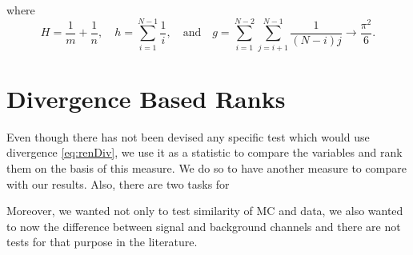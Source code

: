 where
\begin{equation}
H = \frac{1}{m}+\frac{1}{n},\quad	h = \sum_{i=1}^{N-1}\frac{1}{i},\quad \mathrm{ and } \quad g = \sum_{i=1}^{N-2}\sum_{j=i+1}^{N-1}\frac{1}{(N-i)j}\rightarrow \frac{\pi^2}{6}.
\end{equation}

\section{\ren Divergence Based Ranks}
Even though there has not been devised any specific test which would use \ren divergence \eqref{eq:renDiv}, we use it as a statistic to compare the variables and rank them on the basis of this measure. We do so to have another measure to compare with our results. Also, there are two tasks for 

Moreover, we wanted not only to test similarity of MC and data, we also wanted to now the difference between signal and background channels and there are not tests for that purpose in the literature.

